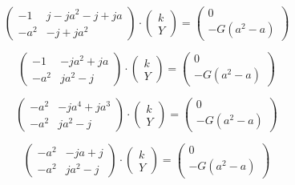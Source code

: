 \documentclass{article}
\begin{document}
$$
    \begin{pmatrix}
        -1   & j - j a^2 - j + j a \\
        -a^2 & - j + j a^2
    \end{pmatrix}
    \cdot
    \begin{pmatrix}
        k \\
        Y
    \end{pmatrix}
    =
    \begin{pmatrix}
        0 \\
        - G (a^2 - a)
    \end{pmatrix}
$$

$$
    \begin{pmatrix}
        -1   & - j a^2 + j a \\
        -a^2 & j a^2 - j
    \end{pmatrix}
    \cdot
    \begin{pmatrix}
        k \\
        Y
    \end{pmatrix}
    =
    \begin{pmatrix}
        0 \\
        - G (a^2 - a)
    \end{pmatrix}
$$

$$
    \begin{pmatrix}
        -a^2 & - j a^4 + j a^3 \\
        -a^2 & j a^2 - j
    \end{pmatrix}
    \cdot
    \begin{pmatrix}
        k \\
        Y
    \end{pmatrix}
    =
    \begin{pmatrix}
        0 \\
        - G (a^2 - a)
    \end{pmatrix}
$$

$$
    \begin{pmatrix}
        -a^2 & - j a + j \\
        -a^2 & j a^2 - j
    \end{pmatrix}
    \cdot
    \begin{pmatrix}
        k \\
        Y
    \end{pmatrix}
    =
    \begin{pmatrix}
        0 \\
        - G (a^2 - a)
    \end{pmatrix}
$$
\end{document}
